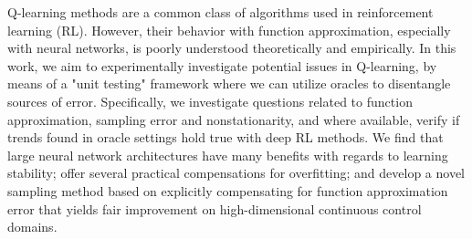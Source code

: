 \documentclass[../thesis.tex]{subfiles}
\begin{document}

% 

% 
% 
% 
% 
% 
% 

Q-learning methods are a common class of algorithms used in reinforcement learning (RL). However, their behavior with function approximation, especially with neural networks, is poorly understood theoretically and empirically. In this work, we aim to experimentally investigate potential issues in Q-learning, by means of a "unit testing" framework where we can utilize oracles to disentangle sources of error. 
Specifically, we investigate questions related to function approximation, sampling error and nonstationarity, and where available, verify if trends found in oracle settings hold true with deep RL methods.
We find that large neural network architectures have many benefits with regards to learning stability; offer several practical compensations for overfitting; and develop a novel sampling method based on explicitly compensating for function approximation error that yields fair improvement on high-dimensional continuous control domains. 
    








\end{document}
